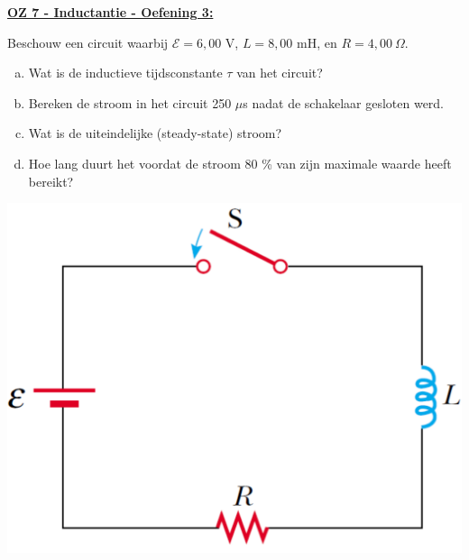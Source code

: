 \textbf{\underline{OZ 7 - Inductantie - Oefening 3:}}
\vspace{0.5cm}

Beschouw een circuit waarbij $ \mathcal{E} = 6,00 $ V, $ L = 8,00 $ mH, en $ R = 4,00 \ \Omega $.

\vspace{0.3cm}
\begin{minipage}{.75\textwidth}
    \begin{enumerate}[(a)]
        \item Wat is de inductieve tijdsconstante $ \tau $ van het circuit?
        \item Bereken de stroom in het circuit 250 $ \mu $s nadat de schakelaar gesloten werd.
        \item Wat is de uiteindelijke (steady-state) stroom?
        \item Hoe lang duurt het voordat de stroom 80 \% van zijn maximale waarde heeft bereikt?
    \end{enumerate}
\end{minipage}
\hspace{0.75cm}\begin{minipage}{.21\textwidth}
    \vspace{-0.5cm}\begin{center}
        \includegraphics[scale = 0.28]{oz07/resources/oef-1-opgave.png}
    \end{center}
\end{minipage}


